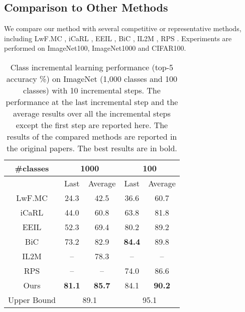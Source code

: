 \documentclass[10pt,twocolumn,letterpaper]{article}
\begin{document}
\subsection{Comparison to Other Methods}
We compare our method with several competitive or representative methods, including LwF.MC \cite{li2017learning,rebuffi2017icarl}, iCaRL \cite{rebuffi2017icarl}, EEIL \cite{castro2018end}, BiC \cite{wu2019large}, IL2M \cite{Belouadah_2019_ICCV}, RPS \cite{Rajasegaran2019RandomPS}. Experiments are performed on ImageNet100, ImageNet1000 and CIFAR100.

\begin{table}[t]
\centering
\caption{Class incremental learning performance (top-5 accuracy \%) on ImageNet (1,000 classes and 100 classes) with 10 incremental steps. The performance at the last incremental step and the average results over all the incremental steps except the first step are reported here. The results of the compared methods are reported in the original papers. The best results are in bold.}
\begin{tabular}{c|cc|cc}
  \toprule
  \#classes & \multicolumn{2}{c|}{1000 } & \multicolumn{2}{c}{100 } \\
  \midrule
        & \multicolumn{1}{c|}{Last} & Average   & \multicolumn{1}{c|}{Last} & Average \\
  \midrule
  \midrule
  LwF.MC \cite{li2017learning,rebuffi2017icarl} & \multicolumn{1}{c|}{24.3 } & 42.5  & \multicolumn{1}{c|}{36.6 } & 60.7  \\
  iCaRL \cite{rebuffi2017icarl} & \multicolumn{1}{c|}{44.0 } & 60.8  & \multicolumn{1}{c|}{63.8 } & 81.8  \\
  EEIL \cite{castro2018end} & \multicolumn{1}{c|}{52.3 } & 69.4  & \multicolumn{1}{c|}{80.2 } & 89.2  \\
  BiC \cite{wu2019large} & \multicolumn{1}{c|}{73.2 } & 82.9  & \multicolumn{1}{c|}{\textbf{84.4}} & 89.8  \\
  IL2M \cite{Belouadah_2019_ICCV} & \multicolumn{1}{c|}{--} & 78.3  & \multicolumn{1}{c|}{--} & -- \\
  RPS \cite{Rajasegaran2019RandomPS} & \multicolumn{1}{c|}{--} & --    & \multicolumn{1}{c|}{74.0 } & 86.6  \\
  Ours  & \multicolumn{1}{c|}{\textbf{81.1}} & \textbf{85.7} & \multicolumn{1}{c|}{84.1 } & \textbf{90.2} \\
  \midrule
  Upper Bound & \multicolumn{2}{c|}{89.1 } & \multicolumn{2}{c}{95.1 } \\
  \bottomrule
  \end{tabular}\label{tab:imagenet}\end{table}
\end{document}
